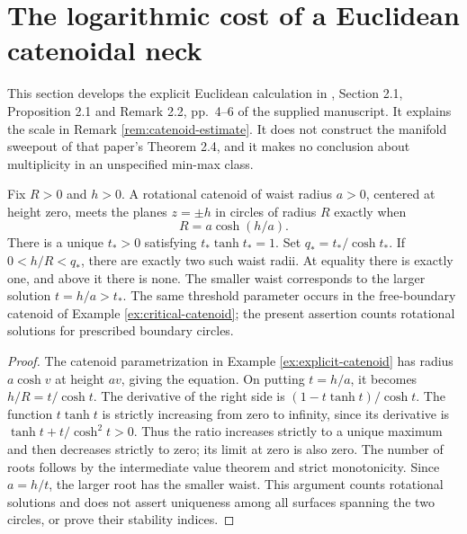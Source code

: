 \chapter{The logarithmic cost of a Euclidean catenoidal neck}\label{sec:catenoidal-neck-models}
This section develops the explicit Euclidean calculation in \cite{KMN}, Section 2.1, Proposition 2.1 and Remark 2.2, pp.~4--6 of the supplied manuscript. It explains the scale in Remark \ref{rem:catenoid-estimate}. It does not construct the manifold sweepout of that paper's Theorem 2.4, and it makes no conclusion about multiplicity in an unspecified min-max class.

\begin{proposition}\label{prop:catenoid-boundary-branches}
Fix $R>0$ and $h>0$. A rotational catenoid of waist radius $a>0$, centered at height zero, meets the planes $z=\pm h$ in circles of radius $R$ exactly when
\[
 R=a\cosh(h/a).
\]
There is a unique $t_*>0$ satisfying $t_*\tanh t_*=1$. Set $q_*=t_*/\cosh t_*$. If $0<h/R<q_*$, there are exactly two such waist radii. At equality there is exactly one, and above it there is none. The smaller waist corresponds to the larger solution $t=h/a>t_*$. The same threshold parameter occurs in the free-boundary catenoid of Example \ref{ex:critical-catenoid}; the present assertion counts rotational solutions for prescribed boundary circles.
\end{proposition}
\begin{proof}
The catenoid parametrization in Example \ref{ex:explicit-catenoid} has radius $a\cosh v$ at height $av$, giving the equation. On putting $t=h/a$, it becomes $h/R=t/\cosh t$. The derivative of the right side is $(1-t\tanh t)/\cosh t$. The function $t\tanh t$ is strictly increasing from zero to infinity, since its derivative is $\tanh t+t/\cosh^2t>0$. Thus the ratio increases strictly to a unique maximum and then decreases strictly to zero; its limit at zero is also zero. The number of roots follows by the intermediate value theorem and strict monotonicity. Since $a=h/t$, the larger root has the smaller waist. This argument counts rotational solutions and does not assert uniqueness among all surfaces spanning the two circles, or prove their stability indices.
\end{proof}

